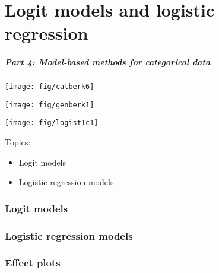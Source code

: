 \renewcommand{\FileName}{part4}
\part{Logit models and logistic regression}
\begin{frame}
  \frametitle{Part 4: Model-based methods for categorical data}
 \begin{minipage}[c]{.33\textwidth}
  \texttt{[image: fig/catberk6]}
  \end{minipage}%
 \hfill
 \begin{minipage}[c]{.33\textwidth}
  \texttt{[image: fig/genberk1]}
 \end{minipage}
 \hfill
 \begin{minipage}[c]{.33\textwidth}
  \texttt{[image: fig/logist1c1]}
 \end{minipage}

Topics:
  \begin{itemize}
    \item Logit models
	\item Logistic regression models
  \end{itemize}
\end{frame}

\section{Logit models}

\section{Logistic regression models}


\section{Effect plots}


